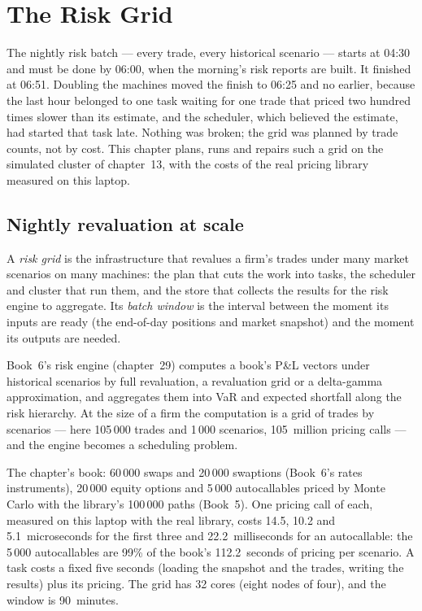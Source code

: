 \chapter{The Risk Grid}\label{ch:pl:the-risk-grid}

The nightly risk batch --- every trade, every historical scenario --- starts at 04:30 and must be done by 06:00, when the morning's risk
reports are built. It finished at 06:51. Doubling the machines moved the finish to 06:25 and no earlier, because the last hour belonged to
one task waiting for one trade that priced two hundred times slower than its estimate, and the scheduler, which believed the estimate,
had started that task late. Nothing was broken; the grid was planned by trade counts, not by cost. This chapter plans, runs and repairs
such a grid on the simulated cluster of chapter~13, with the costs of the real pricing library measured on this laptop.

\section{Nightly revaluation at scale}

\begin{definition}\label{def:pl:the-risk-grid:grid}
A \emph{risk grid} is the infrastructure that revalues a firm's trades under many market scenarios on many machines: the
plan that cuts the work into tasks, the scheduler and cluster that run them, and the store that collects the results for the risk engine to
aggregate. Its \emph{batch window} is the interval between the moment its inputs are ready (the end-of-day positions and
market snapshot) and the moment its outputs are needed.
\end{definition}

Book~6's risk engine (chapter~29) computes a book's P\&L vectors under historical scenarios by full revaluation, a revaluation grid or a
delta-gamma approximation, and aggregates them into VaR and expected shortfall along the risk hierarchy. At the size of a firm the
computation is a grid of trades by scenarios --- here 105\,000 trades and 1\,000 scenarios, 105~million pricing calls --- and the engine
becomes a scheduling problem.

The chapter's book: 60\,000 swaps and 20\,000 swaptions (Book~6's rates instruments), 20\,000 equity options and 5\,000 autocallables
priced by Monte Carlo with the library's 100\,000 paths (Book~5). One pricing call of each, measured on this laptop with the real library,
costs 14.5, 10.2 and 5.1~microseconds for the first three and 22.2~milliseconds for an autocallable: the 5\,000 autocallables are 99\% of
the book's 112.2~seconds of pricing per scenario. A task costs a fixed five seconds (loading the snapshot and the trades, writing the results)
plus its pricing. The grid has 32 cores (eight nodes of four), and the window is 90~minutes.

